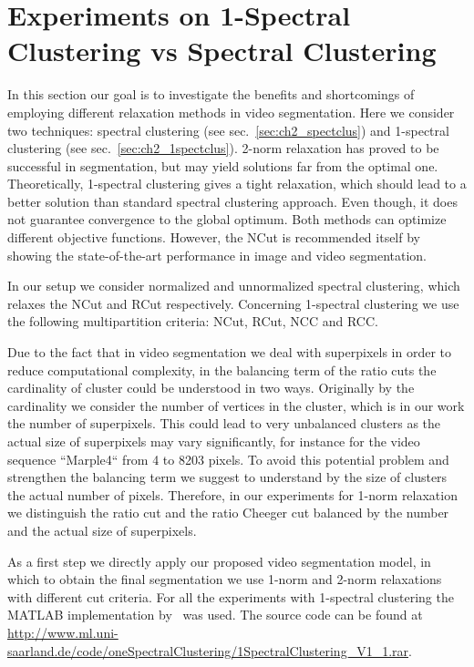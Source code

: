 \section{Experiments on 1-Spectral Clustering vs Spectral Clustering}
\label{sec:ch4_1sc_vs_sc}
In this section our goal is to investigate the benefits and shortcomings of employing different relaxation methods in video segmentation. Here we consider two techniques: spectral clustering (see sec.~\ref{sec:ch2_spectclus}) 
and 1-spectral clustering (see sec.~\ref{sec:ch2_1spectclus}). 2-norm relaxation has proved to be successful in segmentation, but may yield solutions far from the optimal one. 
Theoretically, 1-spectral clustering gives a tight relaxation, which should lead to a better solution than standard spectral clustering approach. 
Even though, it does not guarantee convergence to the global optimum.
Both methods can optimize different objective functions. However, the NCut is recommended itself by showing the state-of-the-art performance in image and video segmentation.

In our setup we consider normalized and unnormalized spectral clustering, which relaxes the NCut and RCut respectively. 
Concerning 1-spectral clustering we use the following multipartition criteria: NCut, RCut, NCC and RCC.

Due to the fact that in video segmentation we deal with superpixels in order to reduce computational complexity, in the balancing term of the ratio cuts the cardinality of cluster could be understood in two ways.
Originally by the cardinality we consider the number of vertices in the cluster, which is in our work the number of superpixels. This could lead to very unbalanced clusters as the actual size of
superpixels may vary significantly, for instance for the video sequence ``Marple4`` from 4 to 8203 pixels. To avoid this potential problem and strengthen the balancing term we suggest to understand by the size of clusters 
the actual number of pixels.
Therefore, in our experiments for 1-norm relaxation we distinguish the ratio cut and the ratio Cheeger cut balanced by the number and the actual size of superpixels. 
   
As a first step we directly apply our proposed video segmentation model, in which to obtain the final segmentation we use 1-norm and 2-norm relaxations with different cut criteria.
For all the experiments with 1-spectral clustering the MATLAB implementation by~\cite{Buhler09} was used. The source code can be found at
\url{http://www.ml.uni-saarland.de/code/oneSpectralClustering/1SpectralClustering_V1_1.rar}.

